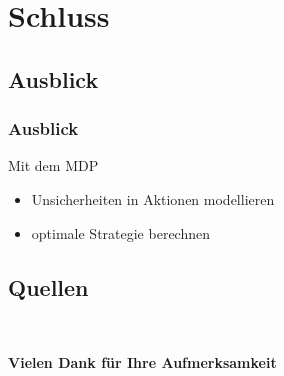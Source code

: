 \documentclass[18pt]{beamer}
\begin{document}
\section{Schluss}
\subsection{Ausblick}
\begin{frame}
	\frametitle{Ausblick}
	Mit dem MDP
	\begin{itemize}
		\item Unsicherheiten in Aktionen modellieren
		\item optimale Strategie berechnen
	\end{itemize}
\end{frame}

\subsection{Quellen}
\begin{frame}{~}
\begin{center}
\vspace{1.5cm}%
	\textbf{{\LARGE Vielen Dank für Ihre Aufmerksamkeit}}%
\end{center}%
	\begin{multicols}{2}%
	\end{multicols}%
\end{frame}
\end{document}
